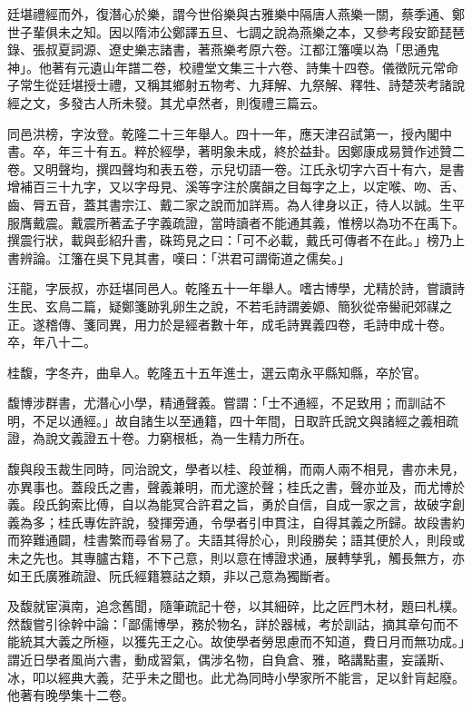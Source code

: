 \begin{pinyinscope}
廷堪禮經而外，復潛心於樂，謂今世俗樂與古雅樂中隔唐人燕樂一關，蔡季通、鄭世子輩俱未之知。因以隋沛公鄭譯五旦、七調之說為燕樂之本，又參考段安節琵琶錄、張叔夏詞源、遼史樂志諸書，著燕樂考原六卷。江都江籓嘆以為「思通鬼神」。他著有元遺山年譜二卷，校禮堂文集三十六卷、詩集十四卷。儀徵阮元常命子常生從廷堪授士禮，又稱其鄉射五物考、九拜解、九祭解、釋牲、詩楚茨考諸說經之文，多發古人所未發。其尤卓然者，則復禮三篇云。

同邑洪榜，字汝登。乾隆二十三年舉人。四十一年，應天津召試第一，授內閣中書。卒，年三十有五。粹於經學，著明象未成，終於益卦。因鄭康成易贊作述贊二卷。又明聲均，撰四聲均和表五卷，示兒切語一卷。江氏永切字六百十有六，是書增補百三十九字，又以字母見、溪等字注於廣韻之目每字之上，以定喉、吻、舌、齒、脣五音，蓋其書宗江、戴二家之說而加詳焉。為人律身以正，待人以誠。生平服膺戴震。戴震所著孟子字義疏證，當時讀者不能通其義，惟榜以為功不在禹下。撰震行狀，載與彭紹升書，硃筠見之曰：「可不必載，戴氏可傳者不在此。」榜乃上書辨論。江籓在吳下見其書，嘆曰：「洪君可謂衛道之儒矣。」

汪龍，字辰叔，亦廷堪同邑人。乾隆五十一年舉人。嗜古博學，尤精於詩，嘗讀詩生民、玄鳥二篇，疑鄭箋跡乳卵生之說，不若毛詩謂姜嫄、簡狄從帝嚳祀郊禖之正。遂稽傳、箋同異，用力於是經者數十年，成毛詩異義四卷，毛詩申成十卷。卒，年八十二。

桂馥，字冬卉，曲阜人。乾隆五十五年進士，選云南永平縣知縣，卒於官。

馥博涉群書，尤潛心小學，精通聲義。嘗謂：「士不通經，不足致用；而訓詁不明，不足以通經。」故自諸生以至通籍，四十年間，日取許氏說文與諸經之義相疏證，為說文義證五十卷。力窮根柢，為一生精力所在。

馥與段玉裁生同時，同治說文，學者以桂、段並稱，而兩人兩不相見，書亦未見，亦異事也。蓋段氏之書，聲義兼明，而尤邃於聲；桂氏之書，聲亦並及，而尤博於義。段氏鉤索比傅，自以為能冥合許君之旨，勇於自信，自成一家之言，故破字創義為多；桂氏專佐許說，發揮旁通，令學者引申貫注，自得其義之所歸。故段書約而猝難通闢，桂書繁而尋省易了。夫語其得於心，則段勝矣；語其便於人，則段或未之先也。其專臚古籍，不下己意，則以意在博證求通，展轉孳乳，觸長無方，亦如王氏廣雅疏證、阮氏經籍篡詁之類，非以己意為獨斷者。

及馥就宦滇南，追念舊聞，隨筆疏記十卷，以其細碎，比之匠門木材，題曰札樸。然馥嘗引徐幹中論：「鄙儒博學，務於物名，詳於器械，考於訓詁，摘其章句而不能統其大義之所極，以獲先王之心。故使學者勞思慮而不知道，費日月而無功成。」謂近日學者風尚六書，動成習氣，偶涉名物，自負倉、雅，略講點畫，妄議斯、冰，叩以經典大義，茫乎未之聞也。此尤為同時小學家所不能言，足以針肓起廢。他著有晚學集十二卷。


\end{pinyinscope}
